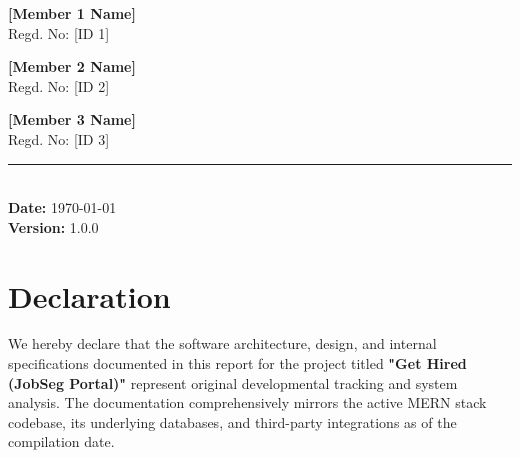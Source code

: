 \documentclass[12pt,a4paper,oneside]{report}
\begin{document}
\begin{titlepage}
\begin{center}
        \begin{minipage}[t]{0.33\textwidth}
            \begin{center}
                \textbf{[Member 1 Name]} \\
                Regd. No: [ID 1]
            \end{center}
        \end{minipage}%
        \begin{minipage}[t]{0.33\textwidth}
            \begin{center}
                \textbf{[Member 2 Name]} \\
                Regd. No: [ID 2]
            \end{center}
        \end{minipage}%
        \begin{minipage}[t]{0.33\textwidth}
            \begin{center}
                \textbf{[Member 3 Name]} \\
                Regd. No: [ID 3]
            \end{center}
        \end{minipage}
        
        \vfill
        
        \rule{0.8\textwidth}{0.4pt} \\
        \vspace{0.5cm}
        {\large \textbf{Date:} \today} \\
        {\large \textbf{Version:} 1.0.0}
        
    \end{center}
\end{titlepage}

\chapter*{Declaration}
We hereby declare that the software architecture, design, and internal specifications documented in this report for the project titled \textbf{"Get Hired (JobSeg Portal)"} represent original developmental tracking and system analysis. The documentation comprehensively mirrors the active MERN stack codebase, its underlying databases, and third-party integrations as of the compilation date.

\vspace{1cm}
\end{document}
